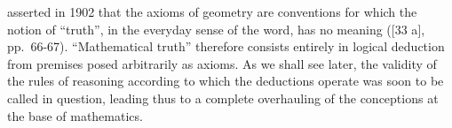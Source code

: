 asserted in 1902 that the axioms of geometry are conventions for which the notion of ``truth'', in the everyday sense of the word, has no meaning ({[}33 a{]}, pp.~66-67). ``Mathematical truth'' therefore consists entirely in logical deduction from premises posed arbitrarily as axioms. As we shall see later, the validity of the rules of reasoning according to which the deductions operate was soon to be called in question, leading thus to a complete overhauling of the conceptions at the base of mathematics.

